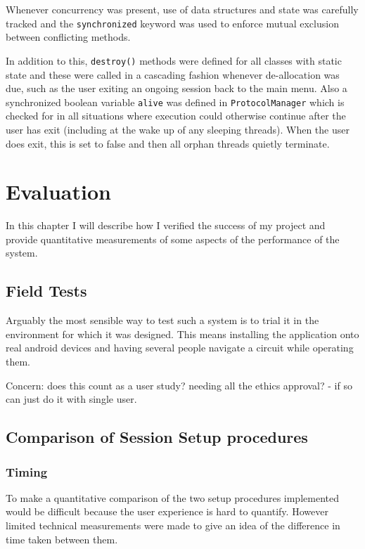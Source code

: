 Whenever concurrency was present, use of data structures and state was carefully tracked and the {\tt synchronized} keyword was used to enforce mutual exclusion between conflicting methods.

In addition to this, {\tt destroy()} methods were defined for all classes with static state and these were called in a cascading fashion whenever de-allocation was due, such as the user exiting an ongoing session back to the main menu. Also a synchronized boolean variable {\tt alive} was defined in {\tt ProtocolManager} which is checked for in all situations where execution could otherwise continue after the user has exit (including at the wake up of any sleeping threads). When the user does exit, this is set to false and then all orphan threads quietly terminate.

\cleardoublepage
\chapter{Evaluation}
\label{eval}

In this chapter I will describe how I verified the success of my project and provide quantitative measurements of some aspects of the performance of the system.

\section{Field Tests}

Arguably the most sensible way to test such a system is to trial it in the environment for which it was designed. This means installing the application onto real android devices and having several people navigate a circuit while operating them.

Concern: does this count as a user study? needing all the ethics approval? - if so can just do it with single user.

\section{Comparison of Session Setup procedures}

\subsection{Timing}
To make a quantitative comparison of the two setup procedures implemented would be difficult because the user experience is hard to quantify. However limited technical measurements were made to give an idea of the difference in time taken between them.

